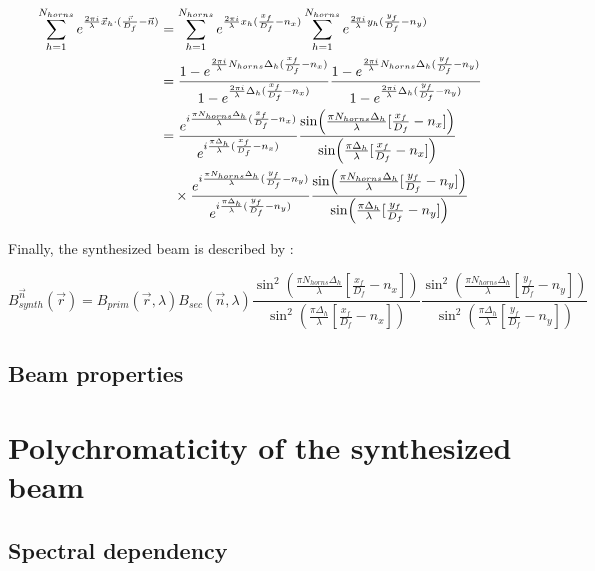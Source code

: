 \documentclass[../../thesis.tex]{subfiles}
\begin{document}
\begin{align}
    \sum_{h=1}^{N_{horns}}e^{\frac{2\pi i}{\lambda} \vec{x}_h \cdot (\frac{\vec{r}}{D_f} - \vec{n})}
    &= \sum_{h=1}^{N_{horns}}e^{\frac{2\pi i}{\lambda} x_h (\frac{x_f}{D_f} - n_x)} \sum_{h=1}^{N_{horns}}e^{\frac{2\pi i}{\lambda} y_h (\frac{y_f}{D_f} - n_y)} \notag \\
    &= \frac{1 - e^{\frac{2\pi i}{\lambda} N_{horns} \Delta_h (\frac{x_f}{D_f} - n_x)}}{1 - e^{\frac{2\pi i}{\lambda} \Delta_h (\frac{x_f}{D_f} - n_x)}} \frac{1 - e^{\frac{2\pi i}{\lambda} N_{horns} \Delta_h (\frac{y_f}{D_f} - n_y)}}{1 - e^{\frac{2\pi i}{\lambda} \Delta_h (\frac{y_f}{D_f} - n_y)}} \notag \\
    &= \frac{e^{i\frac{\pi N_{horns}\Delta_h}{\lambda}(\frac{x_f}{D_f} - n_x)}}{e^{i\frac{\pi\Delta_h}{\lambda}(\frac{x_f}{D_f} - n_x)}} \frac{\sin(\frac{\pi N_{horns}\Delta_h}{\lambda}[\frac{x_f}{D_f} - n_x])}{\sin(\frac{\pi\Delta_h}{\lambda}[\frac{x_f}{D_f} - n_x])} \notag \\
    &\quad\times \frac{e^{i\frac{\pi N_{horns}\Delta_h}{\lambda}(\frac{y_f}{D_f} - n_y)}}{e^{i\frac{\pi\Delta_h}{\lambda}(\frac{y_f}{D_f} - n_y)}} \frac{\sin(\frac{\pi N_{horns}\Delta_h}{\lambda}[\frac{y_f}{D_f} - n_y])}{\sin(\frac{\pi\Delta_h}{\lambda}[\frac{y_f}{D_f} - n_y])}
\end{align}

Finally, the synthesized beam is described by :

\begin{equation}
    B_{synth}^{\vec{n}}(\vec{r}) = B_{prim}(\vec{r}, \lambda)B_{sec}(\vec{n}, \lambda) \frac{\sin^{2}(\frac{\pi N_{horns}\Delta_h}{\lambda}[\frac{x_f}{D_f} - n_x])}{\sin^{2}(\frac{\pi\Delta_h}{\lambda}[\frac{x_f}{D_f} - n_x])}\frac{\sin^{2}(\frac{\pi N_{horns}\Delta_h}{\lambda}[\frac{y_f}{D_f} - n_y])}{\sin^{2}(\frac{\pi\Delta_h}{\lambda}[\frac{y_f}{D_f} - n_y])}
\end{equation}


\subsection{Beam properties}

\section{Polychromaticity of the synthesized beam}

\subsection{Spectral dependency}
\end{document}
